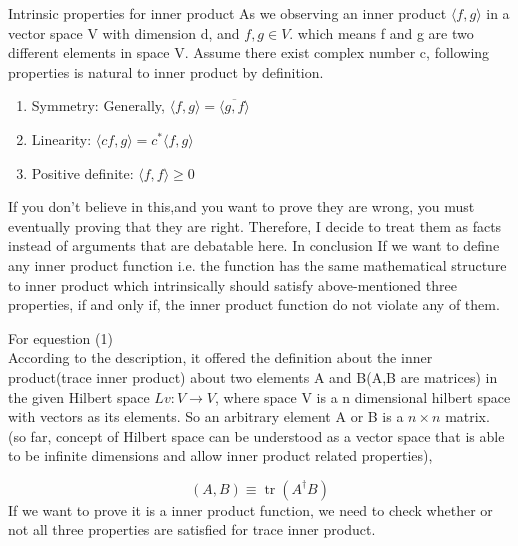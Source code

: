 Intrinsic properties for inner product
As we observing an inner product $\langle f, g\rangle$ in a vector space V with dimension d, and $f,g \in V$. which means f and g are two different elements in space V. Assume there exist complex number c, following properties is natural to inner product by definition.
\begin{CJK*}{UTF8}{bsmi}
\end{CJK*}

\begin{enumerate}
    \item Symmetry: Generally, $\langle f, g\rangle=\langle\overline{g, f}\rangle$ 
    \item Linearity: $\langle cf, g\rangle=c^{*}\langle{f, g}\rangle$
    \item Positive definite:  $\langle f, f\rangle\geq 0$ 
\end{enumerate}
If you don't believe in this,and you want to prove they are wrong, you must eventually proving that they are right. Therefore, I decide to treat them as facts instead of arguments that are debatable here. 
In conclusion If we want to define any inner product function i.e. the function has the same mathematical structure to inner product which intrinsically should satisfy above-mentioned three properties, if and only if, the inner product function do not violate any of them.

For equestion (1)\\
According to the description, it offered the definition about the inner product(trace inner product) about two elements A and B(A,B are matrices) in the given Hilbert space $Lv : V\rightarrow V$, where space V is a n dimensional hilbert space with vectors as its elements. So an arbitrary element A or B is a $n \times n$ matrix. (so far, concept of Hilbert space can be understood as a vector space that is able to be infinite dimensions and allow inner product related properties),

\begin{equation}
(A, B) \equiv \operatorname{tr}\left(A^{\dag} B\right)
\end{equation}
If we want to prove it is a inner product function, we need to check whether or not all three properties are satisfied for trace inner product.

